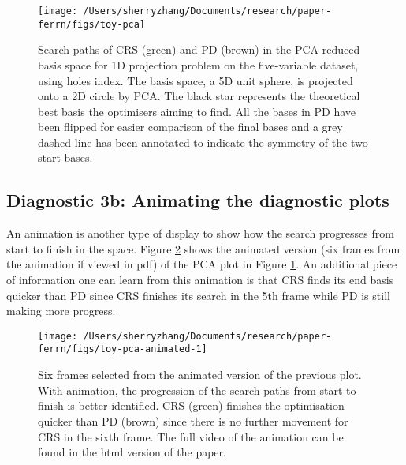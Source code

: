 \begin{Schunk}
\begin{figure}

{\centering \texttt{[image: /Users/sherryzhang/Documents/research/paper-ferrn/figs/toy-pca]} 

}

\caption[Search paths of CRS (green) and PD (brown) in the PCA-reduced basis space for 1D projection problem on the five-variable dataset,  using holes index]{Search paths of CRS (green) and PD (brown) in the PCA-reduced basis space for 1D projection problem on the five-variable dataset,  using holes index. The basis space, a 5D unit sphere, is projected onto a 2D circle by PCA. The black star represents the theoretical best basis the optimisers aiming to find. All the bases in PD have been flipped for easier comparison of the final bases and a grey dashed line has been annotated to indicate the symmetry of the two start bases.}\label{fig:toy-pca}
\end{figure}
\end{Schunk}

\hypertarget{diagnostic-3b-animating-the-diagnostic-plots}{%
\subsection{Diagnostic 3b: Animating the diagnostic
plots}\label{diagnostic-3b-animating-the-diagnostic-plots}}

An animation is another type of display to show how the search
progresses from start to finish in the space. Figure
\ref{fig:toy-pca-animated} shows the animated version (six frames from
the animation if viewed in pdf) of the PCA plot in Figure
\ref{fig:toy-pca}. An additional piece of information one can learn from
this animation is that CRS finds its end basis quicker than PD since CRS
finishes its search in the 5th frame while PD is still making more
progress.

\begin{Schunk}
\begin{figure}

{\centering \texttt{[image: /Users/sherryzhang/Documents/research/paper-ferrn/figs/toy-pca-animated-1]} 

}

\caption[Six frames selected from the animated version of the previous plot]{Six frames selected from the animated version of the previous plot. With animation, the progression of the search paths from start to finish is better identified. CRS (green) finishes the optimisation quicker than PD (brown) since there is no further movement for CRS in the sixth frame. The full video of the animation can be found in the html version of the paper.}\label{fig:toy-pca-animated}
\end{figure}
\end{Schunk}

